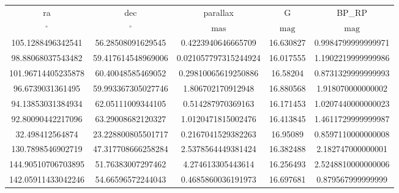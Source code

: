 \begin{table}
\begin{tabular}{ccccc}
ra & dec & parallax & G & BP_RP \\
$\mathrm{{}^{\circ}}$ & $\mathrm{{}^{\circ}}$ & $\mathrm{mas}$ & $\mathrm{mag}$ & $\mathrm{mag}$ \\
105.1288496342541 & 56.28508091629545 & 0.4223940646665709 & 16.630827 & 0.9984799999999971 \\
98.88068037543482 & 59.417614548969006 & 0.021057797315244924 & 16.017555 & 1.1902219999999986 \\
101.96714405235878 & 60.40048585469052 & 0.29810065619250886 & 16.58204 & 0.8731329999999993 \\
96.6739031361495 & 59.993367305027746 & 1.806702170912948 & 16.880568 & 1.918070000000002 \\
94.13853031384934 & 62.05111009344105 & 0.514287970369163 & 16.171453 & 1.0207440000000023 \\
92.80090442217096 & 63.29008682120327 & 1.0120471815002476 & 16.413845 & 1.4611729999999987 \\
32.498412564874 & 23.228800805501717 & 0.2167041529382263 & 16.95089 & 0.8597110000000008 \\
130.7898546902719 & 47.317708666258284 & 2.5378564449381424 & 16.382488 & 2.182747000000001 \\
144.90510706703895 & 51.76383007297462 & 4.274613305443614 & 16.256493 & 2.5248810000000006 \\
142.05911433042246 & 54.66596572244043 & 0.4685860036191973 & 16.697681 & 0.879567999999999 \\
\end{tabular}
\end{table}
